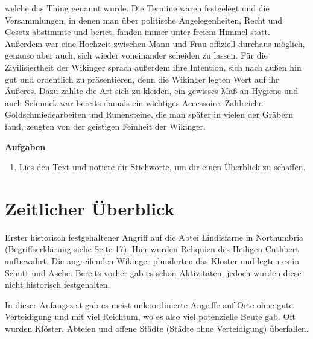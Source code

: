 \documentclass[12pt,a4paper,ngerman,openany]{book}
\newcommand{\aufgaben}[1]{
  \begin{tcolorbox}
    \textbf{Aufgaben}
    \begin{enumerate}
      #1
    \end{enumerate}
  \end{tcolorbox}
} %
\begin{document}
welche das \glqq Thing\grqq{} genannt wurde. Die Termine waren festgelegt und die Versammlungen, in denen man über politische Angelegenheiten, Recht und Gesetz abstimmte und beriet, fanden immer unter freiem Himmel statt.\\
Außerdem war eine Hochzeit zwischen Mann und Frau offiziell durchaus möglich, genauso aber auch, sich wieder voneinander scheiden zu lassen. 
Für die Zivilisiertheit der Wikinger sprach außerdem ihre Intention, sich nach außen hin gut und ordentlich zu präsentieren, denn die Wikinger legten Wert auf ihr Äußeres. Dazu zählte die Art sich zu kleiden,
ein gewisses Maß an Hygiene und auch Schmuck war bereits damals ein wichtiges Accessoire. Zahlreiche Goldschmiedearbeiten und Runensteine, die man später in vielen der Gräbern fand, zeugten von der geistigen Feinheit der Wikinger. 

\aufgaben {
  \item Lies den Text und notiere dir Stichworte, um dir einen Überblick zu schaffen.
}

\pagebreak

\section{Zeitlicher Überblick}

\begin{tcolorbox}[sharp corners, title=08. Juni 793]
Erster historisch festgehaltener Angriff auf die Abtei Lindisfarne in Northumbria (Begriffserklärung siehe Seite 17). Hier wurden Reliquien des Heiligen Cuthbert aufbewahrt. Die angreifenden Wikinger plünderten das Kloster und legten es in Schutt und Asche. Bereits vorher gab es schon Aktivitäten, jedoch wurden diese nicht historisch festgehalten.
\end{tcolorbox}

\begin{tcolorbox}[sharp corners, title=Ungefähr 800 bis 850]
In dieser Anfangszeit gab es meist unkoordinierte Angriffe auf Orte ohne gute Verteidigung und mit viel Reichtum, wo es also viel potenzielle Beute gab. Oft wurden Klöster, Abteien und offene Städte (Städte ohne Verteidigung) überfallen.
\end{tcolorbox}
\end{document}
